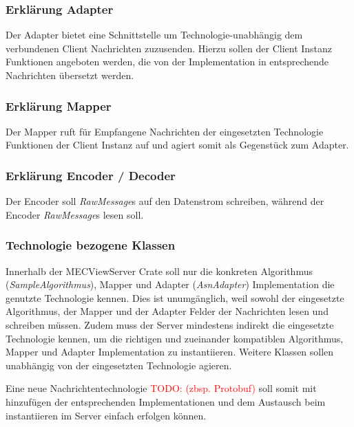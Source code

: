 \documentclass[
	12pt,
	table,
	bigheadings,
	ngerman,
	a4paper,
	BCOR5mm,
	DIV14,
	1.1headlines,
	pagesize,
	oneside,
	openright,
	titlepage,
	headsepline,
	nochapterprefix,
	bibtotoc,
	tocindent,
	listsindent,
	pointlessnumbers,
	cleardoubleempty,
	fleqn,
	halfparskip
]{scrbook}
\newcommand{\todo}[1]{\textcolor{red}{TODO: #1}}
\begin{document}
		\subsubsection{Erklärung Adapter}
		
		Der Adapter bietet eine Schnittstelle um Technologie-unabhängig dem verbundenen Client Nachrichten zuzusenden.
		Hierzu sollen der Client Instanz Funktionen angeboten werden, die von der Implementation in entsprechende Nachrichten übersetzt werden.
		
		\subsubsection{Erklärung Mapper}
		
		Der Mapper ruft für Empfangene Nachrichten der eingesetzten Technologie Funktionen der Client Instanz auf und agiert somit als Gegenstück zum Adapter.
		
		\subsubsection{Erklärung Encoder / Decoder}
		
		Der Encoder soll \textit{RawMessage}s auf den Datenstrom schreiben, während der Encoder \textit{RawMessage}s lesen soll.
		
		\subsubsection{Technologie bezogene Klassen}
		
		Innerhalb der MECViewServer Crate soll nur die konkreten Algorithmus (\textit{SampleAlgorithmus}), Mapper und Adapter (\textit{AsnAdapter}) Implementation die genutzte Technologie kennen.
		Dies ist unumgänglich, weil sowohl der eingesetzte Algorithmus, der Mapper und der Adapter Felder der Nachrichten lesen und schreiben müssen.
		Zudem muss der Server mindestens indirekt die eingesetzte Technologie kennen, um die richtigen und zueinander kompatiblen Algorithmus, Mapper und Adapter Implementation zu instantiieren.
		Weitere Klassen sollen unabhängig von der eingesetzten Technologie agieren.
		
		Eine neue Nachrichtentechnologie \todo{(zbsp. Protobuf)} soll somit mit hinzufügen der entsprechenden Implementationen und dem Austausch beim instantiieren im Server einfach erfolgen können.
		
		
		
		
		
\end{document}
